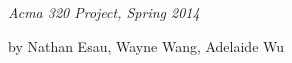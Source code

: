 \begin{titlepage}
\newcommand{\HRule}{\rule{\linewidth}{0.5mm}} 

\center %


\mbox{ }
\vspace{75mm}

{ \Huge \bfseries \color{black}{Analysis of a retirement product}}\\[0.4cm] 

{\Large
\textsl{Acma 320 Project, Spring 2014}}

\bigskip
{\Large
by Nathan Esau, Wayne Wang, Adelaide Wu}

\vfill



\end{titlepage}
